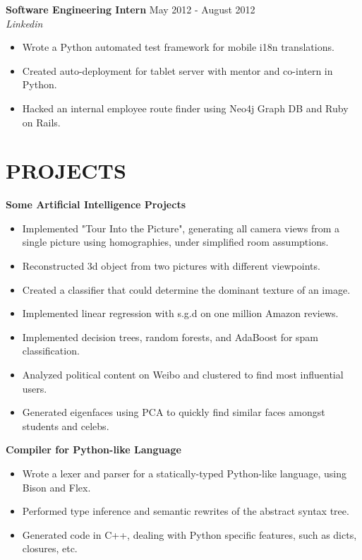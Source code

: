 \documentclass[line,margin]{res}
\begin{document}
\begin{resume}
{\bf Software Engineering Intern} \hfill {\small May 2012 - August 2012} \\
{\it Linkedin}
\begin{itemize}  \itemsep -1pt
  \item Wrote a Python automated test framework for mobile i18n translations.
  \item Created auto-deployment for tablet server with mentor and co-intern in Python.
  \item Hacked an internal employee route finder using Neo4j Graph DB and Ruby on Rails.
\end{itemize}

\section{PROJECTS}
{\bf Some Artificial Intelligence Projects}
\begin{itemize} \itemsep - 1pt
  \item Implemented "Tour Into the Picture", generating all camera views from
    a single picture using homographies, under simplified room assumptions.
  \item Reconstructed 3d object from two pictures with different viewpoints.
  \item Created a classifier that could determine the dominant texture of an image.
  \item Implemented linear regression with s.g.d on one million Amazon reviews.
  \item Implemented decision trees, random forests, and AdaBoost for spam
      classification.
  \item Analyzed political content on Weibo and clustered to find most
      influential users.
  \item Generated eigenfaces using PCA to quickly find similar faces amongst
      students and celebs.
\end{itemize}

{\bf Compiler for Python-like Language}
\begin{itemize} \itemsep - 1pt
  \item Wrote a lexer and parser for a statically-typed Python-like language,
      using Bison and Flex.
  \item Performed type inference and semantic rewrites of the abstract
      syntax tree.
  \item Generated code in C++, dealing with Python specific features, such as
      dicts, closures, etc.
\end{itemize}


\end{resume}
\end{document}
